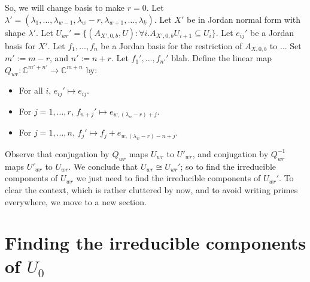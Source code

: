 \documentclass[12pt,psamsfonts]{article}
\begin{document}
So, we will change basis to make \(r = 0\).
Let \(\lambda' = (\lambda_1, ..., \lambda_{w - 1}, \lambda_w - r, \lambda_{w + 1}, ..., \lambda_k)\).
Let \(X'\) be in Jordan normal form with shape \(\lambda'\).
Let \(U_{wr}' = \{(A_{X', 0, b}, U) : \forall i. A_{X', 0, b} U_{i + 1} \subseteq U_i\}\).
Let \(e_{ij}'\) be a Jordan basis for \(X'\).
Let \(f_1, ..., f_n\) be a Jordan basis for the restriction of \(A_{X, 0, b}\) to \(\mathbb{}\)...
Set \(m' := m - r\), and \(n' := n + r\).
Let \(f_1', ..., f_{n'}'\) blah.
Define the linear map \(Q_{wr} : \mathbb{C}^{m' + n'} \to \mathbb{C}^{m + n}\) by:
\begin{itemize}
    \item For all \(i\), \(e_{ij}' \mapsto e_{ij}\).
    \item For \(j = 1, ..., r\), \(f_{n + j}' \mapsto e_{w,(\lambda_w - r) + j}\).
    \item For \(j = 1, ..., n\), \(f_j' \mapsto f_j + e_{w, (\lambda_w - r) - n + j}\).
\end{itemize}
Observe that conjugation by \(Q_{wr}\) maps \(U_{wr}\) to \(U'_{wr}\), and conjugation by \(Q_{wr}^{-1}\) maps \(U'_{wr}\) to \(U_{wr}\).
We conclude that \(U_{wr} \cong U_{wr}'\); so to find the irreducible components of \(U_{wr}\) we just need to find the irreducible components of \(U_{wr}'\).
To clear the context, which is rather cluttered by now, and to avoid writing primes everywhere, we move to a new section.

\section{Finding the irreducible components of \(U_0\)}
\end{document}
